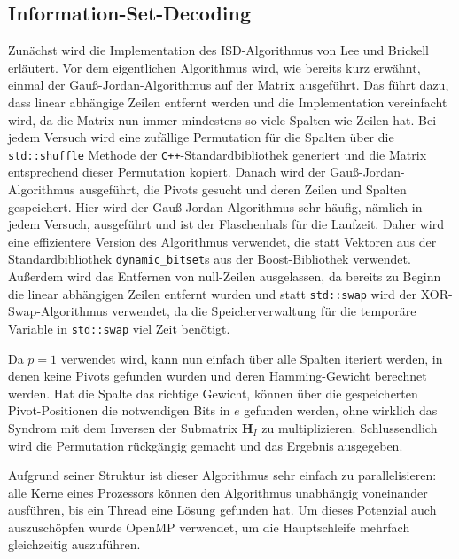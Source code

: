 \documentclass[a4paper,10pt,ngerman]{scrartcl}
\begin{document}
\subsection{Information-Set-Decoding}
Zunächst wird die Implementation des ISD-Algorithmus von Lee und Brickell erläutert.
Vor dem eigentlichen Algorithmus wird, wie bereits kurz erwähnt, einmal der Gauß-Jordan-Algorithmus auf der Matrix ausgeführt. 
Das führt dazu, dass linear abhängige Zeilen entfernt werden und die Implementation vereinfacht wird, da die Matrix nun immer mindestens so viele Spalten wie Zeilen hat.
Bei jedem Versuch wird eine zufällige Permutation für die Spalten über die \lstinline{std::shuffle} Methode der \texttt{C++}-Standardbibliothek generiert und die Matrix entsprechend dieser Permutation kopiert. 
Danach wird der Gauß-Jordan-Algorithmus ausgeführt, die Pivots gesucht und deren Zeilen und Spalten gespeichert. 
Hier wird der Gauß-Jordan-Algorithmus sehr häufig, nämlich in jedem Versuch, ausgeführt und ist der Flaschenhals für die Laufzeit. 
Daher wird eine effizientere Version des Algorithmus verwendet, die statt Vektoren aus der Standardbibliothek \lstinline{dynamic_bitset}s aus der Boost-Bibliothek verwendet.
Außerdem wird das Entfernen von null-Zeilen ausgelassen, da bereits zu Beginn die linear abhängigen Zeilen entfernt wurden und statt \lstinline{std::swap} wird der XOR-Swap-Algorithmus verwendet, da die Speicherverwaltung für die temporäre Variable in \lstinline{std::swap} viel Zeit benötigt.

Da $p=1$ verwendet wird, kann nun einfach über alle Spalten iteriert werden, in denen keine Pivots gefunden wurden und deren Hamming-Gewicht berechnet werden. 
Hat die Spalte das richtige Gewicht, können über die gespeicherten Pivot-Positionen die notwendigen Bits in $e$ gefunden werden, ohne wirklich das Syndrom mit dem Inversen der Submatrix $\mathbf{H}_I$ zu multiplizieren.
Schlussendlich wird die Permutation rückgängig gemacht und das Ergebnis ausgegeben. 

Aufgrund seiner Struktur ist dieser Algorithmus sehr einfach zu parallelisieren: alle Kerne eines Prozessors können den Algorithmus unabhängig voneinander ausführen, bis ein Thread eine Lösung gefunden hat.
Um dieses Potenzial auch auszuschöpfen wurde OpenMP verwendet, um die Hauptschleife mehrfach gleichzeitig auszuführen.
\end{document}
